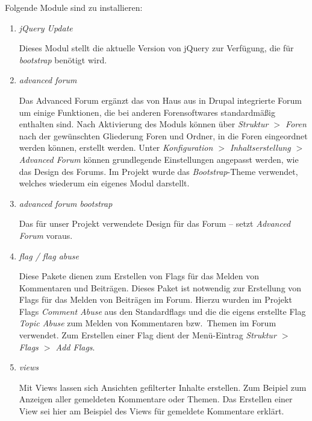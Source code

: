 \documentclass[a4paper,11pt,twoside]{article}
\begin{document}
Folgende Module sind zu installieren: 
\begin{enumerate}
\item \emph{jQuery Update}

Dieses Modul stellt die aktuelle Version von jQuery zur Verfügung, die für
\textit{bootstrap} benötigt wird.
\item \emph{advanced forum}

Das Advanced Forum ergänzt das von Haus aus in Drupal integrierte Forum um
einige Funktionen, die bei anderen Forensoftwares standardmäßig enthalten
sind. Nach Aktivierung des Moduls können über \emph{Struktur $>$ Foren} nach
der gewünschten Gliederung Foren und Ordner, in die Foren eingeordnet werden
können, erstellt werden. Unter \emph{Konfiguration $>$ Inhaltserstellung $>$
  Advanced Forum} können grundlegende Einstellungen angepasst werden, wie das
Design des Forums. Im Projekt wurde das \emph{Bootstrap}-Theme verwendet,
welches wiederum ein eigenes Modul darstellt.
\item \emph{advanced forum bootstrap}

Das für unser Projekt verwendete Design für das Forum -- setzt \emph{Advanced
  Forum} voraus.

\item \emph{flag / flag abuse}

Diese Pakete dienen zum Erstellen von Flags für das Melden von Kommentaren und
Beiträgen. Dieses Paket ist notwendig zur Erstellung von Flags für das Melden
von Beiträgen im Forum. Hierzu wurden im Projekt Flags \textit{Comment Abuse}
aus den Standardflags und die die eigens erstellte Flag \textit{Topic Abuse}
zum Melden von Kommentaren bzw.\ Themen im Forum verwendet. Zum Erstellen einer
Flag dient der Menü-Eintrag \textit{Struktur $>$ Flags $>$ Add Flags}.
\item \emph{views}

Mit Views lassen sich Ansichten gefilterter Inhalte erstellen. Zum Beipiel zum
Anzeigen aller gemeldeten Kommentare oder Themen. Das Erstellen einer View sei
hier am Beispiel des Views für gemeldete Kommentare erklärt.


\end{enumerate}
\end{document}
